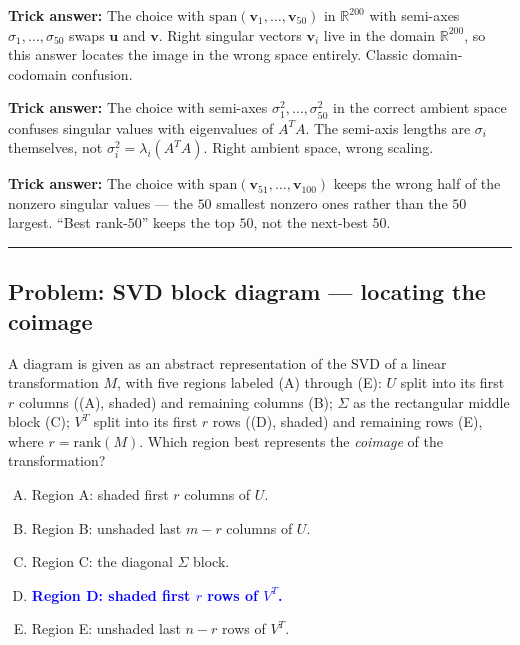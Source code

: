 \documentclass[12pt]{amsart}
\newcommand{\divider}{
  \vspace{-1em}
  \noindent
  \raisebox{-0.15ex}{\textbullet}%
  \hspace{0.5em}%
  \rule[0.5ex]{0.95\textwidth}{1.0pt}%
  \hspace{0.5em}%
  \raisebox{-0.15ex}{\textbullet}%
  \vspace{0em}
}
\begin{document}
\textbf{Trick answer:}
The choice with $\mathrm{span}(\mathbf{v}_1, \ldots, \mathbf{v}_{50})$ in
$\mathbb{R}^{200}$ with semi-axes $\sigma_1, \ldots, \sigma_{50}$ swaps
$\mathbf{u}$ and $\mathbf{v}$. Right singular vectors $\mathbf{v}_i$ live
in the domain $\mathbb{R}^{200}$, so this answer locates the image in the
wrong space entirely. Classic domain-codomain confusion.

\textbf{Trick answer:}
The choice with semi-axes $\sigma_1^2, \ldots, \sigma_{50}^2$ in the
correct ambient space confuses singular values with eigenvalues of $A^TA$.
The semi-axis lengths are $\sigma_i$ themselves, not
$\sigma_i^2 = \lambda_i(A^TA)$. Right ambient space, wrong scaling.

\textbf{Trick answer:}
The choice with $\mathrm{span}(\mathbf{v}_{51}, \ldots, \mathbf{v}_{100})$
keeps the wrong half of the nonzero singular values --- the $50$ smallest
nonzero ones rather than the $50$ largest. ``Best rank-$50$'' keeps the
top $50$, not the next-best $50$.

\divider

\subsection*{Problem: SVD block diagram --- locating the coimage}

A diagram is given as an abstract representation of the SVD of a linear
transformation $M$, with five regions labeled (A) through (E): $U$ split
into its first $r$ columns ((A), shaded) and remaining columns (B);
$\Sigma$ as the rectangular middle block (C); $V^T$ split into its first
$r$ rows ((D), shaded) and remaining rows (E), where $r = \mathrm{rank}(M)$.
Which region best represents the \emph{coimage} of the transformation?

\begin{enumerate}[(A)]
\item Region A: shaded first $r$ columns of $U$.
\item Region B: unshaded last $m - r$ columns of $U$.
\item Region C: the diagonal $\Sigma$ block.
\item \textcolor{blue}{\textbf{Region D: shaded first $r$ rows of $V^T$.}}
\item Region E: unshaded last $n - r$ rows of $V^T$.
\end{enumerate}
\end{document}
